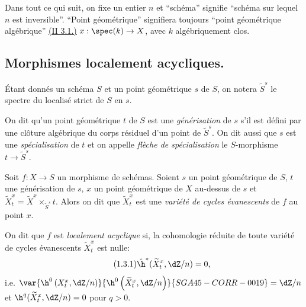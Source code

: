 Dans tout ce qui suit, on fixe un entier $n$ et ``schéma'' signifie ``schéma 
sur lequel $n$ est inversible''. ``Point géométrique'' signifiera toujours 
``point géométrique algébrique'' \hyperref[I:2-3-1]{(II 3.1.)} $x:\spec(k)\to X$, avec $k$ 
algébriquement clos. 










\subsection{Morphismes localement acycliques.}\label{I:5-1}





\begin{sourceexampledotdash}[Notation]\label{I:5-1-1}
Étant donnés un schéma $S$ et un point géométrique $s$ de $S$, on 
notera $\widetilde S^s$ le spectre du localisé strict de $S$ en $s$. 
\end{sourceexampledotdash}





\begin{definitiondotdash}\label{I:5-1-2}
On dit qu'un point géométrique $t$ de $S$ est une \emph{générisation} de 
$s$ s'il est défini par une clôture algébrique du corps résiduel d'un 
point de $\widetilde S^s$. On dit aussi que $s$ est une \emph{spécialisation} 
de $t$ et on appelle \emph{flèche de spécialisation} le $S$-morphisme 
$t\to \widetilde S^s$. 
\end{definitiondotdash}





\begin{definitiondotdash}\label{I:5-1-3}
Soit $f:X\to S$ un morphisme de schémas. Soient $s$ un point géométrique de 
$S$, $t$ une générisation de $s$, $x$ un point géométrique de $X$ 
au-dessus de $s$ et 
$\widetilde X_t^x = \widetilde X^x\times_{\widetilde S^s} t$. Alors on dit que 
$\widetilde X_t^x$ est une \emph{variété de cycles évanescents} de $f$ au 
point $x$. 

On dit que $f$ est \emph{localement acyclique} si, la cohomologie réduite de 
toute variété de cycles évanescents $\widetilde X_t^x$ est nulle:
\begingroup
\makeatletter
\tagsleft@true
\let\veqno\@@leqno
\makeatother
\begin{equation*}\tag{1.3.1}\label{I:eq:5-1-3-1}
  \hat\h^*(\widetilde X_t^x,\dZ/n) = 0\text{,}
\end{equation*}
\endgroup
i.e. $\var{\h^0\left(X_t^x,\dZ/n\right)}{\h^0\left(\widetilde X_t^x,\dZ/n\right)}{SGA45-CORR-0019} = \dZ/n$ et 
$\h^q(\widetilde X_t^x,\dZ/n) = 0$ pour $q>0$. 
\end{definitiondotdash}





